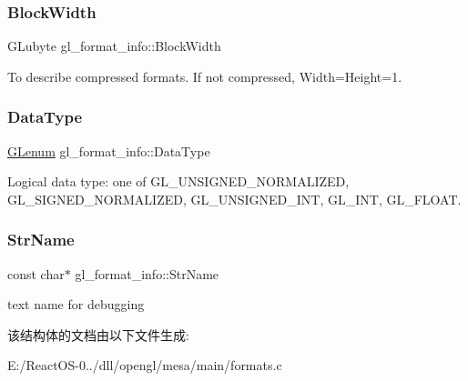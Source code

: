 \subsubsection{\texorpdfstring{Block\+Width}{BlockWidth}}
{\footnotesize\ttfamily G\+Lubyte gl\+\_\+format\+\_\+info\+::\+Block\+Width}

To describe compressed formats. If not compressed, Width=Height=1. \mbox{\label{structgl__format__info_acd2c92774e8b7f897b9c80672492eb75}} 
\subsubsection{\texorpdfstring{Data\+Type}{DataType}}
{\footnotesize\ttfamily \hyperlink{interfacevoid}{G\+Lenum} gl\+\_\+format\+\_\+info\+::\+Data\+Type}

Logical data type\+: one of G\+L\+\_\+\+U\+N\+S\+I\+G\+N\+E\+D\+\_\+\+N\+O\+R\+M\+A\+L\+I\+Z\+ED, G\+L\+\_\+\+S\+I\+G\+N\+E\+D\+\_\+\+N\+O\+R\+M\+A\+L\+I\+Z\+ED, G\+L\+\_\+\+U\+N\+S\+I\+G\+N\+E\+D\+\_\+\+I\+NT, G\+L\+\_\+\+I\+NT, G\+L\+\_\+\+F\+L\+O\+AT. \mbox{\label{structgl__format__info_a35f344f7524df2b809ab6d5e07e4652c}} 
\subsubsection{\texorpdfstring{Str\+Name}{StrName}}
{\footnotesize\ttfamily const char$\ast$ gl\+\_\+format\+\_\+info\+::\+Str\+Name}

text name for debugging 

该结构体的文档由以下文件生成\+:\begin{DoxyCompactItemize}
\item 
E\+:/\+React\+O\+S-\/0../dll/opengl/mesa/main/formats.\+c\end{DoxyCompactItemize}
